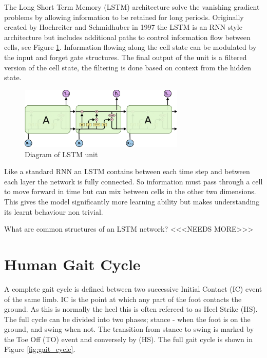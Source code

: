 \documentclass[sensors,article,submit,moreauthors,pdftex]{Definitions/mdpi}
\begin{document}
The Long Short Term Memory (LSTM) architecture solve the vanishing gradient problems by allowing information to be retained for long periods. Originally created by Hochreiter and Schmidhuber in 1997\cite{Hochreiter1997} the LSTM is an RNN style architecture but includes additional paths to control information flow between cells, see Figure \ref{fig:lstm_unit}. Information flowing along the cell state can be modulated by the input and forget gate structures. The final output of the unit is a filtered version of the cell state, the filtering is done based on context from the hidden state.\cite{Olah2015}   %
\begin{figure}[!htb]
    \centering
    \includegraphics[width=0.7\textwidth]{Figures/lstm/LSTM-chain.png}
    \caption{Diagram of LSTM unit \cite{Olah2015}}
    \label{fig:lstm_unit}
\end{figure}

Like a standard RNN an LSTM contains between each time step and between each layer the network is fully connected. So information must pass through a cell to move forward in time but can mix between cells in the other two dimensions. This gives the model significantly more learning ability but makes understanding its learnt behaviour non trivial.

What are common structures of an LSTM network? <<<NEEDS MORE>>>

\section{Human Gait Cycle}
A complete gait cycle is defined between two successive Initial Contact (IC) event of the same limb. IC is the point at which any part of the foot contacts the ground. As this is normally the heel this is often refereed to as Heel Strike (HS). The full cycle can be divided into two phases; stance - when the foot is on the ground, and swing when not. The transition from stance to swing is marked by the Toe Off (TO) event and conversely by (HS). The full gait cycle is shown in Figure \ref{fig:gait_cycle}.
\end{document}
